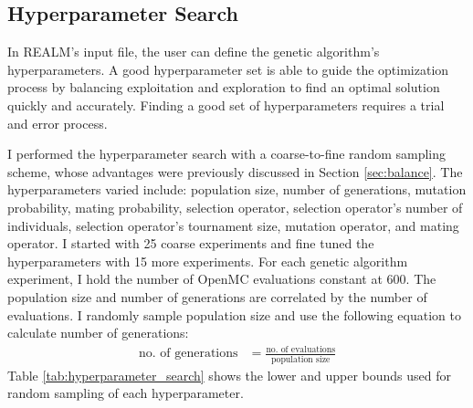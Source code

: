 \subsection{Hyperparameter Search}
In \gls{REALM}'s input file, the user can define the genetic algorithm's 
hyperparameters. 
A good hyperparameter set is able to guide the optimization process by 
balancing exploitation and exploration to find an optimal solution quickly 
and accurately. 
Finding a good set of hyperparameters requires a trial and error process. 

I performed the hyperparameter search with a coarse-to-fine random sampling scheme, 
whose advantages were previously discussed in Section \ref{sec:balance}.
The hyperparameters varied include: population size, number of generations, 
mutation probability, mating probability, selection operator, selection operator's 
number of individuals, selection operator's tournament size, mutation operator, 
and mating operator.  
I started with 25 coarse experiments and fine tuned the hyperparameters
with 15 more experiments. 
For each genetic algorithm experiment, I hold the number of OpenMC evaluations 
constant at 600.
The population size and number of generations are correlated by the number of 
evaluations. 
I randomly sample population size and use the following equation to calculate 
number of generations: 
\begin{align}
    \mbox{no. of generations} &= \frac{\mbox{no. of evaluations}}{\mbox{population size} }
\end{align}
Table \ref{tab:hyperparameter_search} shows the lower and upper bounds used 
for random sampling of each hyperparameter. 
